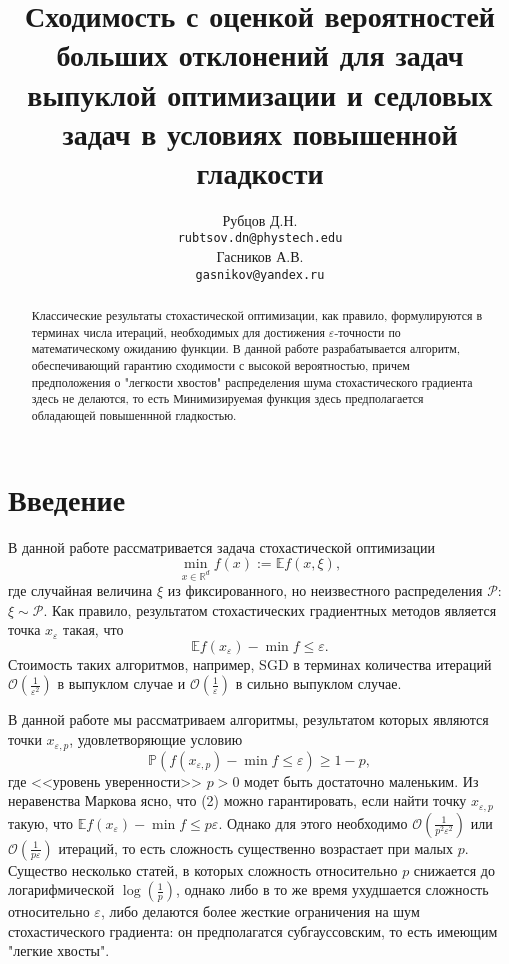 \documentclass{article}
\title{Сходимость с оценкой вероятностей больших отклонений для задач выпуклой оптимизации и седловых задач в условиях повышенной гладкости
}
\author{
	Рубцов Д.Н. \\
	\texttt{rubtsov.dn@phystech.edu} \\
	\And
	Гасников А.В. \\
	\texttt{gasnikov@yandex.ru} \\
}
\date{}
\newcommand{\R}{\mathbb{R}}
\newcommand{\E}{\mathbb{E}}
\newcommand{\e}{\varepsilon}
\begin{document}
\maketitle

\begin{abstract}
Классические результаты стохастической оптимизации, как правило, формулируются в терминах числа итераций, необходимых для достижения $\varepsilon$-точности по математическому ожиданию функции. В данной работе разрабатывается алгоритм, обеспечивающий гарантию сходимости с высокой вероятностью, причем предположения о "легкости хвостов" распределения шума стохастического градиента здесь не делаются, то есть  Минимизируемая функция здесь предполагается обладающей повышеннной гладкостью.

\end{abstract}



\section{Введение}

В данной работе рассматривается задача стохастической оптимизации \[\min_{x \in \R^d} f(x) := \E{f(x, \xi)},\tag{1}\] где случайная величина $\xi$ из фиксированного, но неизвестного распределения $\mathcal{P}$: $\xi \sim \mathcal{P}$. Как правило, результатом стохастических градиентных методов является точка $x_{\e}$ такая, что 
\[\E{f(x_{\e})} - \min f \le \e.\tag{2}\]
Стоимость таких алгоритмов, например, SGD в терминах количества итераций $\mathcal{O} (\frac{1}{\e^2})$ в выпуклом случае и $\mathcal{O} (\frac{1}{\e})$ в сильно выпуклом случае.

В данной работе мы рассматриваем алгоритмы, результатом которых являются точки $x_{\e, p}$, удовлетворяющие условию
\[\mathds{P} (f(x_{\e, p})-\min f \le \e) \ge 1 - p,\tag{3}\]
где <<уровень уверенности>> $p > 0$ модет быть достаточно маленьким. Из неравенства Маркова ясно, что (2) можно гарантировать, если найти точку $x_{\e, p}$ такую, что $\E{f(x_{\e})} - \min f \le p\e$. Однако для этого необходимо $\mathcal{O} (\frac{1}{p^2\e^2})$ или $\mathcal{O} (\frac{1}{p\e})$ итераций, то есть сложность существенно возрастает при малых $p$. Существо несколько статей, в которых сложность относительно $p$ снижается до логарифмической $\log(\frac{1}{p})$, однако либо в то же время ухудшается сложность относительно $\e$, либо делаются более жесткие ограничения на шум стохастического градиента: он предполагатся субгауссовским, то есть имеющим "легкие хвосты".
\end{document}
